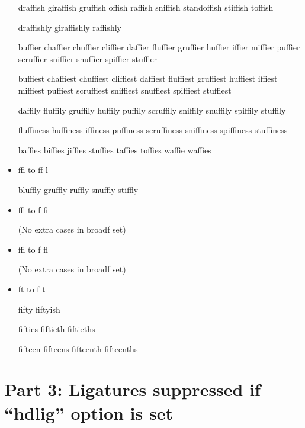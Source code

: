\begin{itemize}
draffish giraffish gruffish offish raffish sniffish standoffish stiffish toffish

draffishly giraffishly raffishly

buffier chaffier chuffier cliffier daffier fluffier gruffier huffier iffier miffier puffier scruffier sniffier snuffier spiffier stuffier

buffiest chaffiest chuffiest cliffiest daffiest fluffiest gruffiest huffiest iffiest miffiest puffiest scruffiest sniffiest snuffiest spiffiest stuffiest

daffily fluffily gruffily huffily puffily scruffily sniffily snuffily spiffily stuffily

fluffiness huffiness iffiness puffiness scruffiness sniffiness spiffiness stuffiness

baffies biffies jiffies stuffies taffies toffies waffie waffies



\item ffl to ff\kern0pt l

bluffly gruffly ruffly snuffly stiffly



\item ffi to f\kern0pt fi

(No extra cases in broadf set)



\item ffl to f\kern0pt fl

(No extra cases in broadf set)



\item ft to f\kern0pt t

fifty fiftyish

fifties fiftieth fiftieths

fifteen fifteens fifteenth fifteenths

\end{itemize}


\section*{Part 3: Ligatures suppressed if ``hdlig'' option is set}

